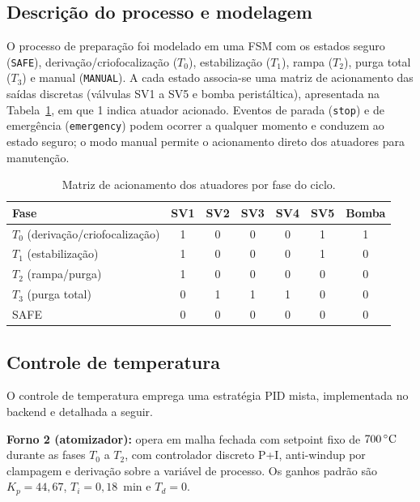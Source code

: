 \subsection{Descri\c{c}\~ao do processo e modelagem}

O processo de prepara\c{c}\~ao foi modelado em uma FSM com os estados seguro
(\texttt{SAFE}), deriva\c{c}\~ao/\allowbreak criofocaliza\c{c}\~ao ($T_0$),
estabiliza\c{c}\~ao ($T_1$), rampa ($T_2$), purga total ($T_3$) e manual
(\texttt{MANUAL}). A cada estado associa-se uma matriz de acionamento das
sa\'idas discretas (v\'alvulas SV1 a SV5 e bomba perist\'altica), apresentada na
Tabela~\ref{tab:matriz}, em que 1 indica atuador acionado. Eventos de parada
(\texttt{stop}) e de emerg\^encia (\texttt{emergency}) podem ocorrer a qualquer
momento e conduzem ao estado seguro; o modo manual permite o acionamento direto
dos atuadores para manuten\c{c}\~ao.

\begin{table}[htbp]
\centering
\caption{Matriz de acionamento dos atuadores por fase do ciclo.}
\label{tab:matriz}
\begin{tabular}{lcccccc}
\toprule
\textbf{Fase} & \textbf{SV1} & \textbf{SV2} & \textbf{SV3} & \textbf{SV4} & \textbf{SV5} & \textbf{Bomba} \\
\midrule
$T_0$ (deriva\c{c}\~ao/criofocaliza\c{c}\~ao) & 1 & 0 & 0 & 0 & 1 & 1 \\
$T_1$ (estabiliza\c{c}\~ao) & 1 & 0 & 0 & 0 & 1 & 0 \\
$T_2$ (rampa/purga) & 1 & 0 & 0 & 0 & 0 & 0 \\
$T_3$ (purga total) & 0 & 1 & 1 & 1 & 0 & 0 \\
SAFE & 0 & 0 & 0 & 0 & 0 & 0 \\
\bottomrule
\end{tabular}
\end{table}

\subsection{Controle de temperatura}

O controle de temperatura emprega uma estrat\'egia PID mista, implementada no
backend e detalhada a seguir.

\textbf{Forno 2 (atomizador):} opera em malha fechada com setpoint fixo de
$700\,\celsius$ durante as fases $T_0$ a $T_2$, com controlador discreto P+I,
anti-windup por clampagem e deriva\c{c}\~ao sobre a vari\'avel de processo. Os
ganhos padr\~ao s\~ao $K_p = 44{,}67$, $T_i = 0{,}18$~min e $T_d = 0$.

